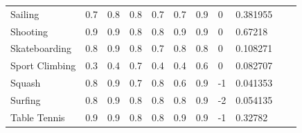 \documentclass[a4paper]{article}
\begin{document}
\begin{table}[h]
\begin{tabular}{|l|lllllll|l|ll}
    Sailing                                     & \multicolumn{1}{l|}{0.7}      & \multicolumn{1}{l|}{0.8}      & \multicolumn{1}{l|}{0.8}  & \multicolumn{1}{l|}{0.7}  & \multicolumn{1}{l|}{0.7}  & \multicolumn{1}{l|}{0.9}      & 0                       & 0.381955                                               &  &  \\ \cline{1-9}
    Shooting                                    & \multicolumn{1}{l|}{0.9}      & \multicolumn{1}{l|}{0.9}      & \multicolumn{1}{l|}{0.8}  & \multicolumn{1}{l|}{0.8}  & \multicolumn{1}{l|}{0.9}  & \multicolumn{1}{l|}{0.9}      & 0                       & 0.67218                                                &  &  \\ \cline{1-9}
    Skateboarding                               & \multicolumn{1}{l|}{0.8}      & \multicolumn{1}{l|}{0.9}      & \multicolumn{1}{l|}{0.8}  & \multicolumn{1}{l|}{0.7}  & \multicolumn{1}{l|}{0.8}  & \multicolumn{1}{l|}{0.8}      & 0                       & 0.108271                                               &  &  \\ \cline{1-9}
    Sport Climbing                              & \multicolumn{1}{l|}{0.3}      & \multicolumn{1}{l|}{0.4}      & \multicolumn{1}{l|}{0.7}  & \multicolumn{1}{l|}{0.4}  & \multicolumn{1}{l|}{0.4}  & \multicolumn{1}{l|}{0.6}      & 0                       & 0.082707                                               &  &  \\ \cline{1-9}
    Squash                                      & \multicolumn{1}{l|}{0.8}      & \multicolumn{1}{l|}{0.9}      & \multicolumn{1}{l|}{0.7}  & \multicolumn{1}{l|}{0.8}  & \multicolumn{1}{l|}{0.6}  & \multicolumn{1}{l|}{0.9}      & -1                      & 0.041353                                               &  &  \\ \cline{1-9}
    Surfing                                     & \multicolumn{1}{l|}{0.8}      & \multicolumn{1}{l|}{0.9}      & \multicolumn{1}{l|}{0.8}  & \multicolumn{1}{l|}{0.8}  & \multicolumn{1}{l|}{0.8}  & \multicolumn{1}{l|}{0.9}      & -2                      & 0.054135                                               &  &  \\ \cline{1-9}
    Table Tennis                                & \multicolumn{1}{l|}{0.9}      & \multicolumn{1}{l|}{0.9}      & \multicolumn{1}{l|}{0.8}  & \multicolumn{1}{l|}{0.8}  & \multicolumn{1}{l|}{0.9}  & \multicolumn{1}{l|}{0.9}      & -1                      & 0.32782                                                &  &  \\ \cline{1-9}

\end{tabular}
\end{table}
\end{document}
